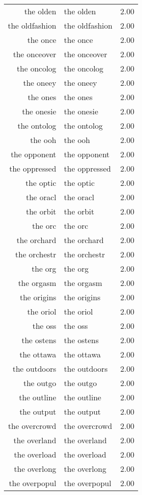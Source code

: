 \begin{table}[ht]
\begin{tabular}{rlr}
  the olden & the olden & 2.00 \\ 
  the oldfashion & the oldfashion & 2.00 \\ 
  the once & the once & 2.00 \\ 
  the onceover & the onceover & 2.00 \\ 
  the oncolog & the oncolog & 2.00 \\ 
  the oneey & the oneey & 2.00 \\ 
  the ones & the ones & 2.00 \\ 
  the onesie & the onesie & 2.00 \\ 
  the ontolog & the ontolog & 2.00 \\ 
  the ooh & the ooh & 2.00 \\ 
  the opponent & the opponent & 2.00 \\ 
  the oppressed & the oppressed & 2.00 \\ 
  the optic & the optic & 2.00 \\ 
  the oracl & the oracl & 2.00 \\ 
  the orbit & the orbit & 2.00 \\ 
  the orc & the orc & 2.00 \\ 
  the orchard & the orchard & 2.00 \\ 
  the orchestr & the orchestr & 2.00 \\ 
  the org & the org & 2.00 \\ 
  the orgasm & the orgasm & 2.00 \\ 
  the origins & the origins & 2.00 \\ 
  the oriol & the oriol & 2.00 \\ 
  the oss & the oss & 2.00 \\ 
  the ostens & the ostens & 2.00 \\ 
  the ottawa & the ottawa & 2.00 \\ 
  the outdoors & the outdoors & 2.00 \\ 
  the outgo & the outgo & 2.00 \\ 
  the outline & the outline & 2.00 \\ 
  the output & the output & 2.00 \\ 
  the overcrowd & the overcrowd & 2.00 \\ 
  the overland & the overland & 2.00 \\ 
  the overload & the overload & 2.00 \\ 
  the overlong & the overlong & 2.00 \\ 
  the overpopul & the overpopul & 2.00 \\ 

\end{tabular}
\end{table}
